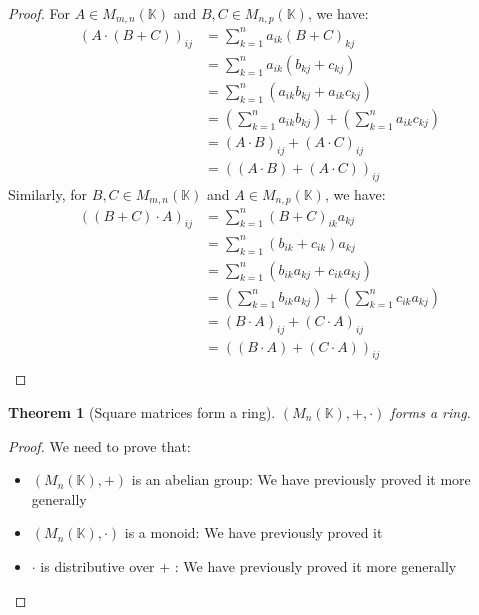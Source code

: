 \documentclass{article}
\newtheorem{theorem}{Theorem}[section]
\theoremstyle{definition}
\theoremstyle{remark}
\theoremstyle{example}
\begin{document}
\begin{proof}
		For $A \in M_{m,n}(\mathbb{K})$ and $B, C \in M_{n,p}(\mathbb{K})$, we have:
		\begin{align*}
				(A \cdot (B + C))_{ij} &= \sum_{k=1}^n a_{ik} (B + C)_{kj}\\
									   &= \sum_{k=1}^n a_{ik} (b_{kj} + c_{kj})\\
									   &= \sum_{k=1}^n (a_{ik} b_{kj} + a_{ik} c_{kj})\\
									   &= (\sum_{k=1}^n a_{ik} b_{kj}) + (\sum_{k=1}^n a_{ik} c_{kj})\\
									   &= (A \cdot B)_{ij} + (A \cdot C)_{ij}\\
									   &= ((A \cdot B) + (A \cdot C))_{ij}
		\end{align*}
		Similarly, for $B, C \in M_{m,n}(\mathbb{K})$ and $A \in M_{n,p}(\mathbb{K})$, we have:
		\begin{align*}
				((B + C) \cdot A)_{ij} &= \sum_{k=1}^n (B + C)_{ik} a_{kj}\\
									   &= \sum_{k=1}^n (b_{ik} + c_{ik}) a_{kj}\\
									   &= \sum_{k=1}^n (b_{ik} a_{kj} + c_{ik} a_{kj})\\
									   &= (\sum_{k=1}^n b_{ik} a_{kj}) + (\sum_{k=1}^n c_{ik} a_{kj})\\
									   &= (B \cdot A)_{ij} + (C \cdot A)_{ij}\\
									   &= ((B \cdot A) + (C \cdot A))_{ij}\\
		\end{align*}
\end{proof}

\begin{theorem}[Square matrices form a ring]
    $(M_n(\mathbb{K}), +, \cdot)$ forms a ring.
\end{theorem}

\begin{proof}
    We need to prove that:
    \begin{itemize}
        \item $(M_n(\mathbb{K}), +)$ is an abelian group: We have previously proved it more generally
        \item $(M_n(\mathbb{K}), \cdot)$ is a monoid: We have previously proved it
        \item $\cdot$ is distributive over $+$ : We have previously proved it more generally
    \end{itemize}
\end{proof}
\end{document}
